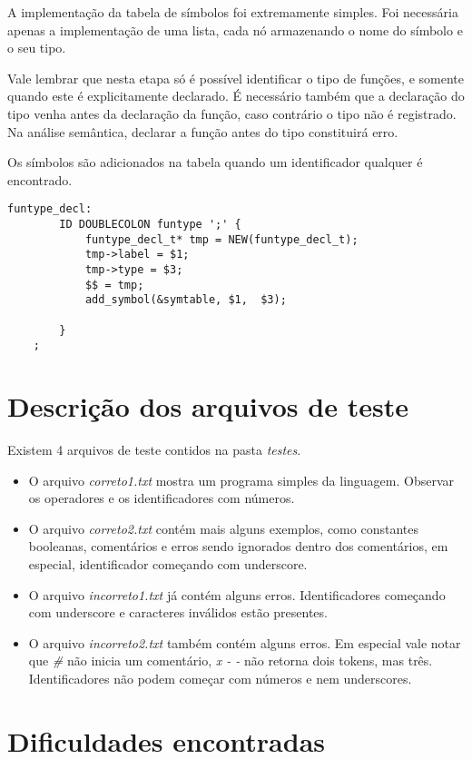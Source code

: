 \documentclass[11pt]{article}
\begin{document}
A implementação da tabela de símbolos foi extremamente simples. Foi necessária apenas a implementação de uma
lista, cada nó armazenando o nome do símbolo e o seu tipo. 

Vale lembrar que nesta etapa só é possível identificar o tipo de funções, e somente quando este é explicitamente declarado.
É necessário também que a declaração do tipo venha antes da declaração da função, caso contrário o tipo não é registrado.
Na análise semântica, declarar a função antes do tipo constituirá erro.

Os símbolos são adicionados na tabela quando um identificador qualquer é encontrado.

\begin{lstlisting}[basicstyle=\small]
    funtype_decl:
        ID DOUBLECOLON funtype ';' {
            funtype_decl_t* tmp = NEW(funtype_decl_t);
            tmp->label = $1;
            tmp->type = $3;
            $$ = tmp;
            add_symbol(&symtable, $1,  $3);

        }
	;
\end{lstlisting}


\section{Descrição dos arquivos de teste}

Existem 4 arquivos de teste contidos na pasta \emph{testes}.
\begin{itemize}
    \item O arquivo \emph{correto1.txt} mostra um programa simples da linguagem. Observar os operadores e os identificadores com números.
    \item O arquivo \emph{correto2.txt} contém mais alguns exemplos, como constantes booleanas, comentários e erros sendo ignorados dentro dos comentários, 
        em especial, identificador começando com underscore.
    \item O arquivo \emph{incorreto1.txt} já contém alguns erros. Identificadores começando com underscore e caracteres inválidos estão presentes.
    \item O arquivo \emph{incorreto2.txt} também contém alguns erros. Em especial vale notar que \emph{\#} não inicia um comentário,
        \emph{x - -} não retorna dois tokens, mas três. Identificadores não podem começar com números e nem underscores.
\end{itemize}


\section{Dificuldades encontradas}
\end{document}
